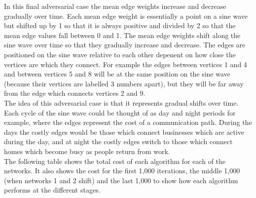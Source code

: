 In this final adversarial case the mean edge weights increase and decrease gradually over time. Each mean edge weight is essentially a point on a sine wave but shifted up by 1 so that it is always positive and divided by 2 so that the mean edge values fall between 0 and 1. The mean edge weights shift along the sine wave over time so that they gradually increase and decrease. The edges are positioned on the sine wave relative to each other depenent on how close the vertices are which they connect. For example the edges between vertices 1 and 4 and between vertices 5 and 8 will be at the same position on the sine wave (because their vertices are labelled 3 numbers apart), but they will be far away from the edge which connects vertices 2 and 9.\\

The idea of this adversarial case is that it represents gradual shifts over time. Each cycle of the sine wave could be thought of as day and night periods for example, where the edges represent the cost of a communication path. During the days the costly edges would be those which connect businesses which are active during the day, and at night the costly edges switch to those which connect homes which become busy as people return from work.\\

The following table shows the total cost of each algorithm for each of the networks. It also shows the cost for the first 1,000 iterations, the middle 1,000 (when networks 1 and 2 shift) and the last 1,000 to show how each algorithm performs at the different stages.\\


